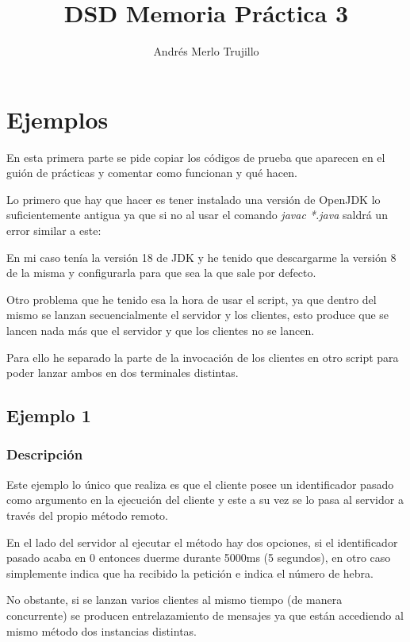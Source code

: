 \documentclass{article}
\title{DSD Memoria Práctica 3}
\author{Andrés Merlo Trujillo}
\date{}
\begin{document}
\maketitle

\section{Ejemplos}
En esta primera parte se pide copiar los códigos de prueba que aparecen en el guión de prácticas y comentar como funcionan y qué hacen.

Lo primero que hay que hacer es tener instalado una versión de OpenJDK lo suficientemente antigua ya que si no al usar el comando \textit{javac *.java} saldrá un error similar a este:


En mi caso tenía la versión 18 de JDK y he tenido que descargarme la versión 8 de la misma y configurarla para que sea la que sale por defecto.

Otro problema que he tenido esa la hora de usar el script, ya que dentro del mismo se lanzan secuencialmente el servidor y los clientes, esto produce que se lancen nada más que el servidor y que los clientes no se lancen.

Para ello he separado la parte de la invocación de los clientes en otro script para poder lanzar ambos en dos terminales distintas.

\subsection{Ejemplo 1}
\subsubsection{Descripción}
Este ejemplo lo único que realiza es que el cliente posee un identificador pasado como argumento en la ejecución del cliente y este a su vez se lo pasa al servidor a través del propio método remoto.

En el lado del servidor al ejecutar el método hay dos opciones, si el identificador pasado acaba en 0 entonces duerme durante 5000ms (5 segundos), en otro caso simplemente indica que ha recibido la petición e indica el número de hebra.

No obstante, si se lanzan varios clientes al mismo tiempo (de manera concurrente) se producen entrelazamiento de mensajes ya que están accediendo al mismo método dos instancias distintas.
\end{document}
